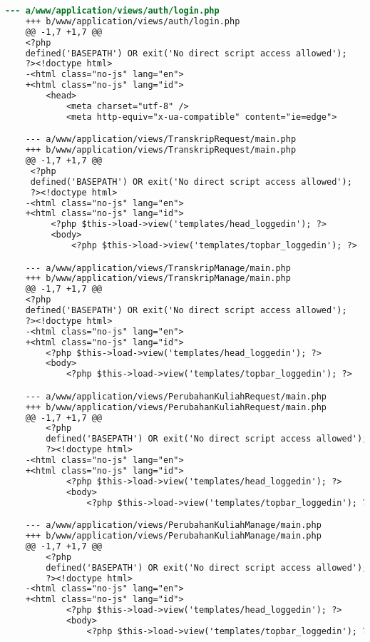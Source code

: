 \begin{lstlisting}[frame=single, label={lst:perbaikan_3.1.1_bahasa_halaman}, language=diff, caption=Perbaikan Kriteria Sukses 3.1.1 - Bahasa yang Tidak Sesuai]
    --- a/www/application/views/auth/login.php
    +++ b/www/application/views/auth/login.php
    @@ -1,7 +1,7 @@
    <?php
    defined('BASEPATH') OR exit('No direct script access allowed');
    ?><!doctype html>
    -<html class="no-js" lang="en">
    +<html class="no-js" lang="id">
        <head>
            <meta charset="utf-8" />
            <meta http-equiv="x-ua-compatible" content="ie=edge">

    --- a/www/application/views/TranskripRequest/main.php
    +++ b/www/application/views/TranskripRequest/main.php
    @@ -1,7 +1,7 @@
     <?php
     defined('BASEPATH') OR exit('No direct script access allowed');
     ?><!doctype html>
    -<html class="no-js" lang="en">
    +<html class="no-js" lang="id">
         <?php $this->load->view('templates/head_loggedin'); ?>
         <body>
             <?php $this->load->view('templates/topbar_loggedin'); ?>

    --- a/www/application/views/TranskripManage/main.php
    +++ b/www/application/views/TranskripManage/main.php
    @@ -1,7 +1,7 @@
    <?php
    defined('BASEPATH') OR exit('No direct script access allowed');
    ?><!doctype html>
    -<html class="no-js" lang="en">
    +<html class="no-js" lang="id">
        <?php $this->load->view('templates/head_loggedin'); ?>
        <body>
            <?php $this->load->view('templates/topbar_loggedin'); ?>

    --- a/www/application/views/PerubahanKuliahRequest/main.php
    +++ b/www/application/views/PerubahanKuliahRequest/main.php
    @@ -1,7 +1,7 @@
        <?php
        defined('BASEPATH') OR exit('No direct script access allowed');
        ?><!doctype html>
    -<html class="no-js" lang="en">
    +<html class="no-js" lang="id">
            <?php $this->load->view('templates/head_loggedin'); ?>
            <body>
                <?php $this->load->view('templates/topbar_loggedin'); ?>

    --- a/www/application/views/PerubahanKuliahManage/main.php
    +++ b/www/application/views/PerubahanKuliahManage/main.php
    @@ -1,7 +1,7 @@
        <?php
        defined('BASEPATH') OR exit('No direct script access allowed');
        ?><!doctype html>
    -<html class="no-js" lang="en">
    +<html class="no-js" lang="id">
            <?php $this->load->view('templates/head_loggedin'); ?>
            <body>
                <?php $this->load->view('templates/topbar_loggedin'); ?>


\end{lstlisting}
